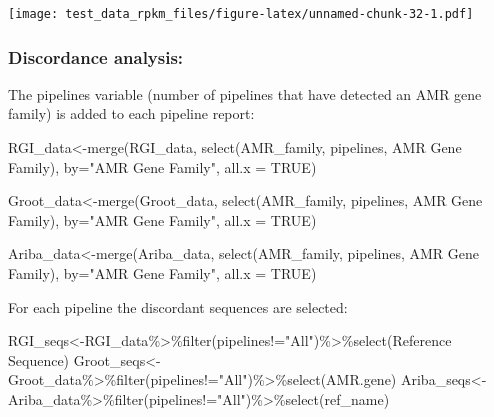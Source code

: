 \documentclass[
]{article}
\newenvironment{Shaded}{\begin{snugshade}}{\end{snugshade}}
\newcommand{\AttributeTok}[1]{\textcolor[rgb]{0.77,0.63,0.00}{#1}}
\newcommand{\ConstantTok}[1]{\textcolor[rgb]{0.00,0.00,0.00}{#1}}
\newcommand{\FunctionTok}[1]{\textcolor[rgb]{0.00,0.00,0.00}{#1}}
\newcommand{\NormalTok}[1]{#1}
\newcommand{\OtherTok}[1]{\textcolor[rgb]{0.56,0.35,0.01}{#1}}
\newcommand{\SpecialCharTok}[1]{\textcolor[rgb]{0.00,0.00,0.00}{#1}}
\newcommand{\StringTok}[1]{\textcolor[rgb]{0.31,0.60,0.02}{#1}}
\begin{document}
\texttt{[image: test\_data\_rpkm\_files/figure-latex/unnamed-chunk-32-1.pdf]}

\hypertarget{discordance-analysis}{%
\subsubsection{Discordance analysis:}\label{discordance-analysis}}

The pipelines variable (number of pipelines that have detected an AMR
gene family) is added to each pipeline report:

\begin{Shaded}
\begin{Highlighting}[]
\NormalTok{RGI\_data}\OtherTok{\textless{}{-}}\FunctionTok{merge}\NormalTok{(RGI\_data, }\FunctionTok{select}\NormalTok{(AMR\_family, pipelines, }\StringTok{\textasciigrave{}}\AttributeTok{AMR Gene Family}\StringTok{\textasciigrave{}}\NormalTok{), }\AttributeTok{by=}\StringTok{"AMR Gene Family"}\NormalTok{, }\AttributeTok{all.x =} \ConstantTok{TRUE}\NormalTok{)}

\NormalTok{Groot\_data}\OtherTok{\textless{}{-}}\FunctionTok{merge}\NormalTok{(Groot\_data, }\FunctionTok{select}\NormalTok{(AMR\_family, pipelines, }\StringTok{\textasciigrave{}}\AttributeTok{AMR Gene Family}\StringTok{\textasciigrave{}}\NormalTok{), }\AttributeTok{by=}\StringTok{"AMR Gene Family"}\NormalTok{, }\AttributeTok{all.x =} \ConstantTok{TRUE}\NormalTok{)}

\NormalTok{Ariba\_data}\OtherTok{\textless{}{-}}\FunctionTok{merge}\NormalTok{(Ariba\_data, }\FunctionTok{select}\NormalTok{(AMR\_family, pipelines, }\StringTok{\textasciigrave{}}\AttributeTok{AMR Gene Family}\StringTok{\textasciigrave{}}\NormalTok{), }\AttributeTok{by=}\StringTok{"AMR Gene Family"}\NormalTok{, }\AttributeTok{all.x =} \ConstantTok{TRUE}\NormalTok{)}
\end{Highlighting}
\end{Shaded}

For each pipeline the discordant sequences are selected:

\begin{Shaded}
\begin{Highlighting}[]
\NormalTok{RGI\_seqs}\OtherTok{\textless{}{-}}\NormalTok{RGI\_data}\SpecialCharTok{\%\textgreater{}\%}\FunctionTok{filter}\NormalTok{(pipelines}\SpecialCharTok{!=}\StringTok{"All"}\NormalTok{)}\SpecialCharTok{\%\textgreater{}\%}\FunctionTok{select}\NormalTok{(}\StringTok{\textasciigrave{}}\AttributeTok{Reference Sequence}\StringTok{\textasciigrave{}}\NormalTok{)}
\NormalTok{Groot\_seqs}\OtherTok{\textless{}{-}}\NormalTok{Groot\_data}\SpecialCharTok{\%\textgreater{}\%}\FunctionTok{filter}\NormalTok{(pipelines}\SpecialCharTok{!=}\StringTok{"All"}\NormalTok{)}\SpecialCharTok{\%\textgreater{}\%}\FunctionTok{select}\NormalTok{(AMR.gene)}
\NormalTok{Ariba\_seqs}\OtherTok{\textless{}{-}}\NormalTok{Ariba\_data}\SpecialCharTok{\%\textgreater{}\%}\FunctionTok{filter}\NormalTok{(pipelines}\SpecialCharTok{!=}\StringTok{"All"}\NormalTok{)}\SpecialCharTok{\%\textgreater{}\%}\FunctionTok{select}\NormalTok{(ref\_name)}
\end{Highlighting}
\end{Shaded}
\end{document}
